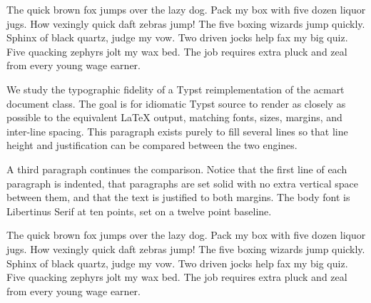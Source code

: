 \documentclass[acmsmall,nonacm]{acmart}
\begin{document}
\thispagestyle{empty}%

The quick brown fox jumps over the lazy dog. Pack my box with five dozen
liquor jugs. How vexingly quick daft zebras jump! The five boxing wizards
jump quickly. Sphinx of black quartz, judge my vow. Two driven jocks help
fax my big quiz. Five quacking zephyrs jolt my wax bed. The job requires
extra pluck and zeal from every young wage earner.

We study the typographic fidelity of a Typst reimplementation of the acmart
document class. The goal is for idiomatic Typst source to render as closely
as possible to the equivalent LaTeX output, matching fonts, sizes, margins,
and inter-line spacing. This paragraph exists purely to fill several lines so
that line height and justification can be compared between the two engines.

A third paragraph continues the comparison. Notice that the first line of each
paragraph is indented, that paragraphs are set solid with no extra vertical
space between them, and that the text is justified to both margins. The body
font is Libertinus Serif at ten points, set on a twelve point baseline.

The quick brown fox jumps over the lazy dog. Pack my box with five dozen
liquor jugs. How vexingly quick daft zebras jump! The five boxing wizards
jump quickly. Sphinx of black quartz, judge my vow. Two driven jocks help
fax my big quiz. Five quacking zephyrs jolt my wax bed. The job requires
extra pluck and zeal from every young wage earner.
\end{document}
